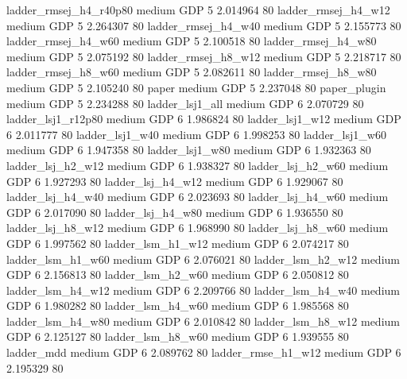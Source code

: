 ladder_rmsej_h4_r40p80     medium      GDP                 5 2.014964 80
   ladder_rmsej_h4_w12     medium      GDP                 5 2.264307 80
   ladder_rmsej_h4_w40     medium      GDP                 5 2.155773 80
   ladder_rmsej_h4_w60     medium      GDP                 5 2.100518 80
   ladder_rmsej_h4_w80     medium      GDP                 5 2.075192 80
   ladder_rmsej_h8_w12     medium      GDP                 5 2.218717 80
   ladder_rmsej_h8_w60     medium      GDP                 5 2.082611 80
   ladder_rmsej_h8_w80     medium      GDP                 5 2.105240 80
                 paper     medium      GDP                 5 2.237048 80
          paper_plugin     medium      GDP                 5 2.234288 80
       ladder_lsj1_all     medium      GDP                 6 2.070729 80
    ladder_lsj1_r12p80     medium      GDP                 6 1.986824 80
       ladder_lsj1_w12     medium      GDP                 6 2.011777 80
       ladder_lsj1_w40     medium      GDP                 6 1.998253 80
       ladder_lsj1_w60     medium      GDP                 6 1.947358 80
       ladder_lsj1_w80     medium      GDP                 6 1.932363 80
     ladder_lsj_h2_w12     medium      GDP                 6 1.938327 80
     ladder_lsj_h2_w60     medium      GDP                 6 1.927293 80
     ladder_lsj_h4_w12     medium      GDP                 6 1.929067 80
     ladder_lsj_h4_w40     medium      GDP                 6 2.023693 80
     ladder_lsj_h4_w60     medium      GDP                 6 2.017090 80
     ladder_lsj_h4_w80     medium      GDP                 6 1.936550 80
     ladder_lsj_h8_w12     medium      GDP                 6 1.968990 80
     ladder_lsj_h8_w60     medium      GDP                 6 1.997562 80
     ladder_lsm_h1_w12     medium      GDP                 6 2.074217 80
     ladder_lsm_h1_w60     medium      GDP                 6 2.076021 80
     ladder_lsm_h2_w12     medium      GDP                 6 2.156813 80
     ladder_lsm_h2_w60     medium      GDP                 6 2.050812 80
     ladder_lsm_h4_w12     medium      GDP                 6 2.209766 80
     ladder_lsm_h4_w40     medium      GDP                 6 1.980282 80
     ladder_lsm_h4_w60     medium      GDP                 6 1.985568 80
     ladder_lsm_h4_w80     medium      GDP                 6 2.010842 80
     ladder_lsm_h8_w12     medium      GDP                 6 2.125127 80
     ladder_lsm_h8_w60     medium      GDP                 6 1.939555 80
            ladder_mdd     medium      GDP                 6 2.089762 80
    ladder_rmse_h1_w12     medium      GDP                 6 2.195329 80
